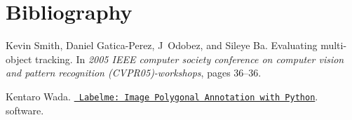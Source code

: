 \chapter{Bibliography}
\hypertarget{a00738}{}\label{a00738}

\begin{DoxyDescription}
\item[\label{a00738_CITEREF_evaluation}%
\Hypertarget{a00738_CITEREF_evaluation}%
\mbox{[}1\mbox{]}]Kevin Smith, Daniel Gatica-\/\+Perez, J~Odobez, and Sileye Ba. Evaluating multi-\/object tracking. In {\itshape 2005 IEEE computer society conference on computer vision and pattern recognition (CVPR\textquotesingle{}05)-\/workshops}, pages 36--36.


\item[\label{a00738_CITEREF_labelme}%
\Hypertarget{a00738_CITEREF_labelme}%
\mbox{[}2\mbox{]}]Kentaro Wada. \href{https://github.com/wkentaro/labelme}{\texttt{ Labelme\+: Image Polygonal Annotation with Python}}. software. 


\end{DoxyDescription}